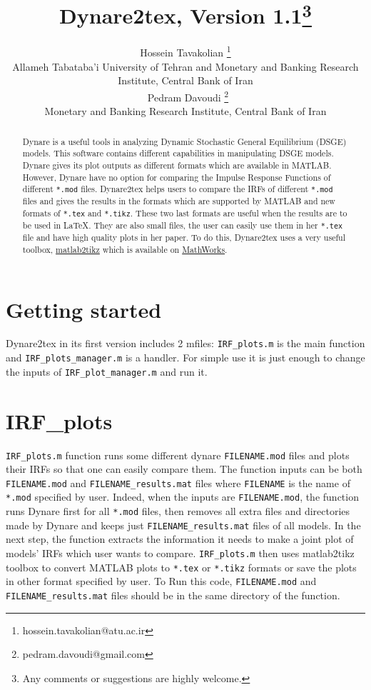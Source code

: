 \documentclass[11pt,a4paper]{article}
\title{Dynare2tex, Version 1.1\thanks{Any comments or suggestions are highly welcome.}}
\author{
Hossein Tavakolian \thanks{hossein.tavakolian@atu.ac.ir}\\
Allameh Tabataba'i University of Tehran and Monetary and Banking Research Institute, Central Bank of Iran\\\
Pedram Davoudi \thanks{pedram.davoudi@gmail.com}\\
Monetary and Banking Research Institute, Central Bank of Iran}
\begin{document}
\maketitle
\begin{abstract}
Dynare is a useful tools in analyzing Dynamic Stochastic General Equilibrium (DSGE) models. This software contains different capabilities in manipulating DSGE models. Dynare gives its plot outputs as different formats which are available in MATLAB. However, Dynare have no option for comparing the Impulse Response Functions of different \texttt{*.mod} files. Dynare2tex helps users to compare the IRFs of different \texttt{*.mod} files and gives the results in the formats which are supported by MATLAB and new formats of \texttt{*.tex} and \texttt{*.tikz}. These two last formats are useful when the results are to be used in \LaTeX. They are also small files, the user can easily use them in her \texttt{*.tex} file and have high quality plots in her paper. To do this, Dynare2tex uses a very useful toolbox, \href{<http://www.mathworks.com/matlabcentral/fileexchange/22022-matlab2tikz-matlab2tikz>}{matlab2tikz} which is available on \href{<http://www.mathworks.com/matlabcentral>}{MathWorks}.
\end{abstract}

\section{Getting started}
Dynare2tex in its first version includes 2 mfiles: \texttt{IRF\_plots.m} is the main function and \texttt{IRF\_plots\_manager.m} is a handler. For simple use it is just enough to change the inputs of \texttt{IRF\_plot\_manager.m} and run it. 

\section{IRF\_plots}
\texttt{IRF\_plots.m} function runs some different dynare \texttt{FILENAME.mod} files and plots their IRFs so that one can easily compare them. The function inputs can be both \texttt{FILENAME.mod} and \texttt{FILENAME_results.mat} files where \texttt{FILENAME} is the name of \texttt{*.mod} specified by user. Indeed, when the inputs are \texttt{FILENAME.mod}, the function runs Dynare first for all \texttt{*.mod} files, then removes all extra files and directories made by Dynare and keeps just \texttt{FILENAME_results.mat} files of all models. In the next step, the function extracts the information it needs to make a joint plot of models' IRFs which user wants to compare. \texttt{IRF\_plots.m} then uses matlab2tikz toolbox to convert MATLAB plots to \texttt{*.tex} or \texttt{*.tikz} formats or save the plots in other format specified by user. To Run this code, \texttt{FILENAME.mod} and \texttt{FILENAME_results.mat} files should be in the same directory of the function.
\end{document}
